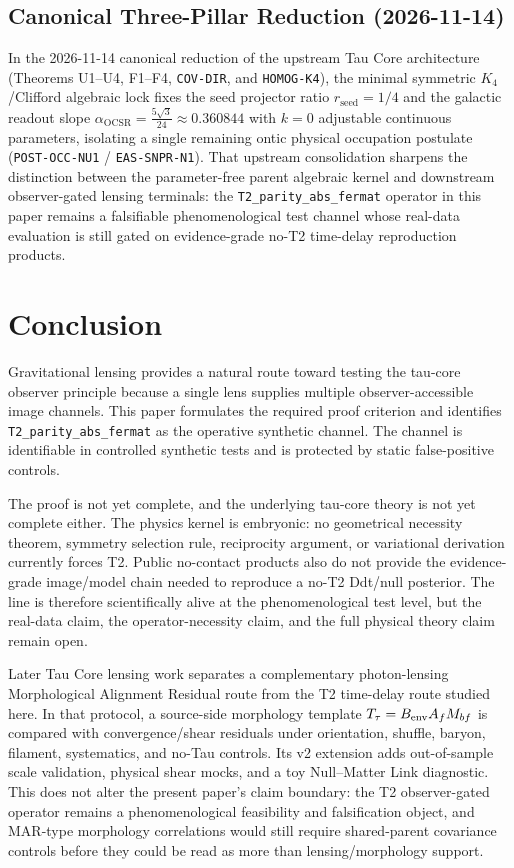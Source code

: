 \documentclass[11pt]{article}
\begin{document}
\subsection{Canonical Three-Pillar Reduction (2026-11-14)}
In the 2026-11-14 canonical reduction of the upstream Tau Core architecture
(Theorems U1--U4, F1--F4, \texttt{COV-DIR}, and \texttt{HOMOG-K4}), the minimal
symmetric $K_4$/Clifford algebraic lock fixes the seed projector ratio
$r_{\mathrm{seed}} = 1/4$ and the galactic readout slope
$\alpha_{\mathrm{OCSR}} = \frac{5\sqrt{3}}{24} \approx 0.360844$ with $k = 0$
adjustable continuous parameters, isolating a single remaining ontic physical
occupation postulate (\texttt{POST-OCC-NU1} / \texttt{EAS-SNPR-N1}). That
upstream consolidation sharpens the distinction between the parameter-free
parent algebraic kernel and downstream observer-gated lensing terminals: the
\texttt{T2\_parity\_abs\_fermat} operator in this paper remains a falsifiable
phenomenological test channel whose real-data evaluation is still gated on
evidence-grade no-T2 time-delay reproduction products.

\section{Conclusion}\label{conclusion}

Gravitational lensing provides a natural route toward testing the
tau-core observer principle because a single lens supplies multiple
observer-accessible image channels. This paper formulates the required
proof criterion and identifies \texttt{T2\_parity\_abs\_fermat} as the
operative synthetic channel. The channel is identifiable in controlled
synthetic tests and is protected by static false-positive controls.

The proof is not yet complete, and the underlying tau-core theory is not
yet complete either. The physics kernel is embryonic: no geometrical
necessity theorem, symmetry selection rule, reciprocity argument, or
variational derivation currently forces T2. Public no-contact products
also do not provide the evidence-grade image/model chain needed to
reproduce a no-T2 Ddt/null posterior. The line is therefore
scientifically alive at the phenomenological test level, but the
real-data claim, the operator-necessity claim, and the full physical
theory claim remain open.

Later Tau Core lensing work separates a complementary photon-lensing
Morphological Alignment Residual route from the T2 time-delay route studied
here.  In that protocol, a source-side morphology template
\(T_{\tau}=B_{\rm env}A_fM_{bf}\) is compared with convergence/shear residuals
under orientation, shuffle, baryon, filament, systematics, and no-Tau controls.
Its v2 extension adds out-of-sample scale validation, physical shear mocks, and
a toy Null--Matter Link diagnostic.  This does not alter the present paper's
claim boundary: the T2 observer-gated operator remains a phenomenological
feasibility and falsification object, and MAR-type morphology correlations
would still require shared-parent covariance controls before they could be read
as more than lensing/morphology support.
\end{document}
